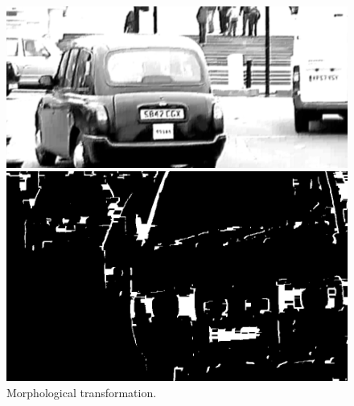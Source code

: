 \documentclass[letterpaper,12pt]{article}
\begin{document}
\begin{figure}
	\centering
	\begin{minipage}[b]{.4\textwidth}
		\centering \includegraphics[width=0.8\columnwidth]{gaussian.png}
		
		\caption{
			\label{fig:7} %
			Gaussian Filter.
		}
		
	\end{minipage}\qquad
	\begin{minipage}[b]{.4\textwidth}
		
		\centering \includegraphics[width=0.8\columnwidth]{morpho.png}
		
		\caption{
			\label{fig:8} %
			Morphological transformation.
		}
		
	\end{minipage}
\end{figure}
\end{document}
